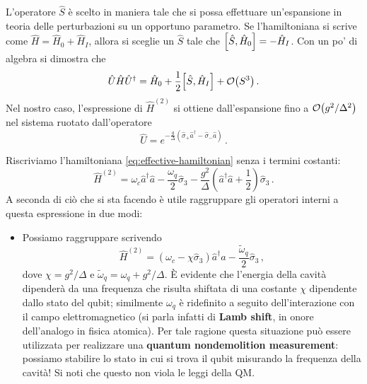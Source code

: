 \begin{itemize}
    L'operatore $\hat{S}$ è scelto in maniera tale che si possa effettuare un'espansione in teoria delle perturbazioni su un opportuno parametro. Se l'hamiltoniana si scrive come $\hat{H} = \hat{H}_0 + \hat{H}_I$, allora si sceglie un $\hat{S}$ tale che $\comm{\hat{S}}{\hat{H}_0} = -\hat{H}_I$. Con un po' di algebra si dimostra che
    \begin{equation*}
        \hat{U} \hat{H} \hat{U}^\dag = \hat{H}_0 + \frac{1}{2} \comm{\hat{S}}{\hat{H}_I} + \order{S^3} \, .
    \end{equation*}
    Nel nostro caso, l'espressione di $\hat H^{(2)}$ si ottiene dall'espansione fino a $\order{g^2/\Delta^2}$ nel sistema ruotato dall'operatore
    \begin{equation*}
        \hat U = e^{-\frac{g}{\Delta}(\hat \sigma_+\hat a^\dagger - \hat \sigma_-\hat a)} \, .
    \end{equation*}
    
    Riscriviamo l'hamiltoniana \eqref{eq:effective-hamiltonian} senza i termini costanti:
    \begin{equation*}
        \hat H^{(2)} = \omega_c  \hat a^\dagger \hat a - \frac{\omega_q}2\hat \sigma_3 - \frac{g^2}{\Delta}\left(\hat a^\dagger \hat a + \frac 12\right) \hat{\sigma}_3 \, .
    \end{equation*}
    A seconda di ciò che si sta facendo è utile raggruppare gli operatori interni a questa espressione in due modi:
    
    \begin{itemize}
        \item Possiamo raggruppare scrivendo 
    \begin{equation*}
        \hat H^{(2)}= \left(\omega_c-\chi\hat \sigma_3\right)\hat a^\dagger \hat a-\frac{\tilde{\omega}_q}{2}\hat \sigma_3 \, ,
    \end{equation*}
    dove $\chi = g^2/\Delta$ e $\tilde{\omega}_q=\omega_q+g^2/\Delta$. È evidente che l'energia della cavità dipenderà da una frequenza che risulta shiftata di una costante $\chi$ dipendente dallo stato del qubit; similmente $\omega_q$ è ridefinito a seguito dell'interazione con il campo elettromagnetico (si parla infatti di \textbf{Lamb shift}, in onore dell'analogo in fisica atomica). Per tale ragione questa situazione può essere utilizzata per realizzare una \textbf{quantum nondemolition measurement}: possiamo stabilire lo stato in cui si trova il qubit misurando la frequenza della cavità! Si noti che questo non viola le leggi della QM.
    

\end{itemize}
\end{itemize}
